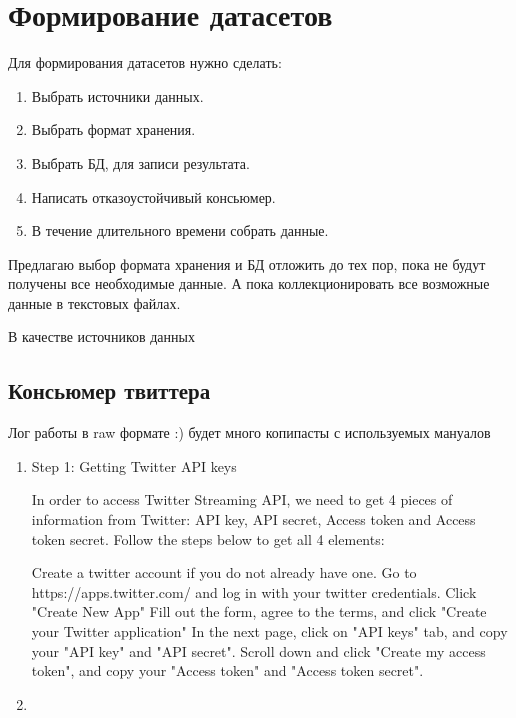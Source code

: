

\section{Формирование датасетов}
    Для формирования датасетов нужно сделать:
    \begin{enumerate}
        \item Выбрать источники данных.
        \item Выбрать формат хранения.
        \item Выбрать БД, для записи результата.
        \item Написать отказоустойчивый консьюмер.
        \item В течение длительного времени собрать данные.
    \end{enumerate}

    Предлагаю выбор формата хранения и БД отложить до тех пор, пока не будут получены все необходимые данные. А пока коллекционировать все возможные данные в текстовых файлах.

    В качестве источников данных 

    \subsection{Консьюмер твиттера}
        Лог работы в raw формате :) будет много копипасты с используемых мануалов

        \begin{enumerate}
            \item Step 1: Getting Twitter API keys

                In order to access Twitter Streaming API, we need to get 4 pieces of information from Twitter: API key, API secret, Access token and Access token secret. Follow the steps below to get all 4 elements:

                Create a twitter account if you do not already have one.
                Go to https://apps.twitter.com/ and log in with your twitter credentials.
                Click "Create New App"
                Fill out the form, agree to the terms, and click "Create your Twitter application"
                In the next page, click on "API keys" tab, and copy your "API key" and "API secret".
                Scroll down and click "Create my access token", and copy your "Access token" and "Access token secret".
            \item 
        \end{enumerate}

